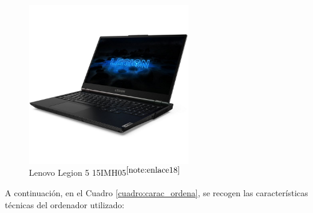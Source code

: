 \begin{figure} [H]
    \begin{center}
      \includegraphics[width=7cm]{figs/Lenovo Legion 5 15imh05.jpg}
    \end{center}
    \caption{Lenovo Legion 5 15IMH05$^{\ref{note:enlace18}}$}
    \label{fig:PC_Lenovo}
\end{figure}

\setcounter{footnote}{18} 

A continuación, en el Cuadro \ref{cuadro:carac_ordena}, se recogen las características técnicas del ordenador utilizado:

